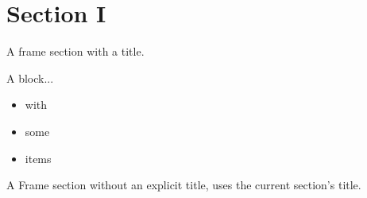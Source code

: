 \documentclass{beamer}
\begin{document}
\section*{Section I}

\begin{framesection}
  \begin{sframe}
    A frame section with a title.
  \end{sframe}

  \begin{sframe}
    \begin{block}{A block...}
        \begin{itemize}
          \item with 
          \item some
          \item items
        \end{itemize}
    \end{block}
  \end{sframe}

\end{framesection}

\begin{framesection}
  \begin{sframe}
    A Frame section without an explicit title, uses the current section's title.
  \end{sframe}
\end{framesection}
\end{document}

